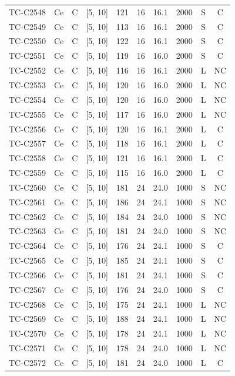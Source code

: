 \begin{longtable}{lccccccccc}
TC-C2548 & Ce & C & [5, 10] & 121 & 16 & 16.1 & 2000 & S & C \\
TC-C2549 & Ce & C & [5, 10] & 113 & 16 & 16.1 & 2000 & S & C \\
TC-C2550 & Ce & C & [5, 10] & 122 & 16 & 16.1 & 2000 & S & C \\
TC-C2551 & Ce & C & [5, 10] & 119 & 16 & 16.0 & 2000 & S & C \\
TC-C2552 & Ce & C & [5, 10] & 116 & 16 & 16.1 & 2000 & L & NC \\
TC-C2553 & Ce & C & [5, 10] & 120 & 16 & 16.0 & 2000 & L & NC \\
TC-C2554 & Ce & C & [5, 10] & 120 & 16 & 16.0 & 2000 & L & NC \\
TC-C2555 & Ce & C & [5, 10] & 117 & 16 & 16.0 & 2000 & L & NC \\
TC-C2556 & Ce & C & [5, 10] & 120 & 16 & 16.1 & 2000 & L & C \\
TC-C2557 & Ce & C & [5, 10] & 118 & 16 & 16.1 & 2000 & L & C \\
TC-C2558 & Ce & C & [5, 10] & 121 & 16 & 16.1 & 2000 & L & C \\
TC-C2559 & Ce & C & [5, 10] & 115 & 16 & 16.0 & 2000 & L & C \\
TC-C2560 & Ce & C & [5, 10] & 181 & 24 & 24.0 & 1000 & S & NC \\
TC-C2561 & Ce & C & [5, 10] & 186 & 24 & 24.1 & 1000 & S & NC \\
TC-C2562 & Ce & C & [5, 10] & 184 & 24 & 24.0 & 1000 & S & NC \\
TC-C2563 & Ce & C & [5, 10] & 181 & 24 & 24.0 & 1000 & S & NC \\
TC-C2564 & Ce & C & [5, 10] & 176 & 24 & 24.1 & 1000 & S & C \\
TC-C2565 & Ce & C & [5, 10] & 185 & 24 & 24.1 & 1000 & S & C \\
TC-C2566 & Ce & C & [5, 10] & 181 & 24 & 24.1 & 1000 & S & C \\
TC-C2567 & Ce & C & [5, 10] & 176 & 24 & 24.0 & 1000 & S & C \\
TC-C2568 & Ce & C & [5, 10] & 175 & 24 & 24.1 & 1000 & L & NC \\
TC-C2569 & Ce & C & [5, 10] & 188 & 24 & 24.1 & 1000 & L & NC \\
TC-C2570 & Ce & C & [5, 10] & 178 & 24 & 24.1 & 1000 & L & NC \\
TC-C2571 & Ce & C & [5, 10] & 178 & 24 & 24.0 & 1000 & L & NC \\
TC-C2572 & Ce & C & [5, 10] & 181 & 24 & 24.0 & 1000 & L & C \\

\end{longtable}

